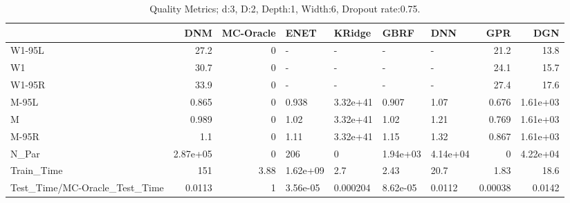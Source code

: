 \begin{table}
\centering
\caption{Quality Metrics; d:3, D:2, Depth:1, Width:6, Dropout rate:0.75.}
\begin{tabular}{lrrllllrr}
\toprule
{} &      DNM &  MC-Oracle &     ENET &   KRidge &     GBRF &      DNN &     GPR &      DGN \\
\midrule
W1-95L                        &     27.2 &          0 &        - &        - &        - &        - &    21.2 &     13.8 \\
W1                            &     30.7 &          0 &        - &        - &        - &        - &    24.1 &     15.7 \\
W1-95R                        &     33.9 &          0 &        - &        - &        - &        - &    27.4 &     17.6 \\
M-95L                         &    0.865 &          0 &    0.938 & 3.32e+41 &    0.907 &     1.07 &   0.676 & 1.61e+03 \\
M                             &    0.989 &          0 &     1.02 & 3.32e+41 &     1.02 &     1.21 &   0.769 & 1.61e+03 \\
M-95R                         &      1.1 &          0 &     1.11 & 3.32e+41 &     1.15 &     1.32 &   0.867 & 1.61e+03 \\
N\_Par                         & 2.87e+05 &          0 &      206 &        0 & 1.94e+03 & 4.14e+04 &       0 & 4.22e+04 \\
Train\_Time                    &      151 &       3.88 & 1.62e+09 &      2.7 &     2.43 &     20.7 &    1.83 &     18.6 \\
Test\_Time/MC-Oracle\_Test\_Time &   0.0113 &          1 & 3.56e-05 & 0.000204 & 8.62e-05 &   0.0112 & 0.00038 &   0.0142 \\
\bottomrule
\end{tabular}
\end{table}
